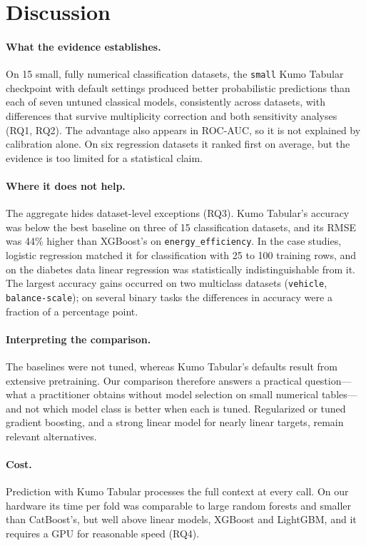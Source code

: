 \section{Discussion}
\label{sec:discussion}

\paragraph{What the evidence establishes.}
On 15 small, fully numerical classification datasets, the \texttt{small} Kumo Tabular checkpoint with default settings
produced better probabilistic predictions than each of seven untuned classical models, consistently across datasets,
with differences that survive multiplicity correction and both sensitivity analyses (RQ1, RQ2). The advantage also
appears in ROC-AUC, so it is not explained by calibration alone. On six regression datasets it ranked first on average,
but the evidence is too limited for a statistical claim.

\paragraph{Where it does not help.}
The aggregate hides dataset-level exceptions (RQ3). Kumo Tabular's accuracy was below the best baseline on three of 15
classification datasets, and its RMSE was 44\% higher than XGBoost's on \texttt{energy\_efficiency}. In the case
studies, logistic regression matched it for classification with 25 to 100 training rows, and on the diabetes data
linear regression was statistically indistinguishable from it. The largest accuracy gains occurred on two multiclass
datasets (\texttt{vehicle}, \texttt{balance-scale}); on several binary tasks the differences in accuracy were a fraction
of a percentage point.

\paragraph{Interpreting the comparison.}
The baselines were not tuned, whereas Kumo Tabular's defaults result from extensive pretraining. Our comparison
therefore answers a practical question---what a practitioner obtains without model selection on small numerical
tables---and not which model class is better when each is tuned. Regularized or tuned gradient boosting, and a strong
linear model for nearly linear targets, remain relevant alternatives.

\paragraph{Cost.}
Prediction with Kumo Tabular processes the full context at every call. On our hardware its time per fold was comparable
to large random forests and smaller than CatBoost's, but well above linear models, XGBoost and LightGBM, and it requires
a GPU for reasonable speed (RQ4).

